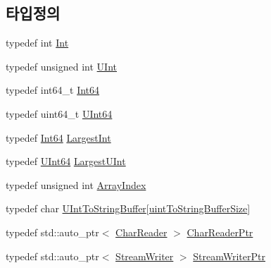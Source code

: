 \subsection*{타입정의}
\begin{DoxyCompactItemize}
\item 
typedef int \hyperlink{namespace_json_a08122e8005b706d982e48cca1e2119c7}{Int}
\item 
typedef unsigned int \hyperlink{namespace_json_a800fb90eb6ee8d5d62b600c06f87f7d4}{U\+Int}
\item 
typedef int64\+\_\+t \hyperlink{namespace_json_ac62566f36fd33115957b91305c9ed1dc}{Int64}
\item 
typedef uint64\+\_\+t \hyperlink{namespace_json_adf3fa5cb60c619e4f02315ad355e0ca1}{U\+Int64}
\item 
typedef \hyperlink{namespace_json_ac62566f36fd33115957b91305c9ed1dc}{Int64} \hyperlink{namespace_json_a218d880af853ce786cd985e82571d297}{Largest\+Int}
\item 
typedef \hyperlink{namespace_json_adf3fa5cb60c619e4f02315ad355e0ca1}{U\+Int64} \hyperlink{namespace_json_ae202ecad69725e23443f465e257456d0}{Largest\+U\+Int}
\item 
typedef unsigned int \hyperlink{namespace_json_a8048e741f2177c3b5d9ede4a5b8c53c2}{Array\+Index}
\item 
typedef char \hyperlink{namespace_json_a602bcf69c2042fb61c3b243cb16f04ca}{U\+Int\+To\+String\+Buffer}\mbox{[}\hyperlink{namespace_json_a2aacab54ef6fc18e833fbd4982a0a23aae4f2008c7919f20d81286121d1374424}{uint\+To\+String\+Buffer\+Size}\mbox{]}
\item 
typedef std\+::auto\+\_\+ptr$<$ \hyperlink{class_json_1_1_char_reader}{Char\+Reader} $>$ \hyperlink{namespace_json_a4724efb8d41614b47036cb8b54233837}{Char\+Reader\+Ptr}
\item 
typedef std\+::auto\+\_\+ptr$<$ \hyperlink{class_json_1_1_stream_writer}{Stream\+Writer} $>$ \hyperlink{namespace_json_a7132404aeebfc96d7c6ad2c66260afb5}{Stream\+Writer\+Ptr}
\end{DoxyCompactItemize}

